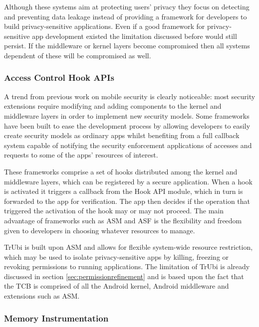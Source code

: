 Although these systems aim at protecting users' privacy they focus on detecting and preventing data leakage instead of providing a framework for developers to build privacy-sensitive applications. Even if a good framework for privacy-sensitive app development existed the limitation discussed before would still persist. If the middleware or kernel layers become compromised then all systems dependent of these will be compromised as well.

\subsubsection{Access Control Hook APIs}
\label{sec:accesscontrolhooks}

A trend from previous work on mobile security is clearly noticeable: most security extensions require modifying and adding components to the kernel and middleware layers in order to implement new security models. Some frameworks have been built to ease the development process by allowing developers to easily create security models as ordinary apps whilst benefiting from a full callback system capable of notifying the security enforcement applications of accesses and requests to some of the apps' resources of interest.

These frameworks comprise a set of hooks distributed among the kernel and middleware layers, which can be registered by a secure application. When a hook is activated it triggers a callback from the Hook API module, which in turn is forwarded to the app for verification. The app then decides if the operation that triggered the activation of the hook may or may not proceed. The main advantage of frameworks such as \ac{ASM} \cite{heuser2014asm} and \ac{ASF} \cite{backes2014android} is the flexibility and freedom given to developers in choosing whatever resources to manage.

TrUbi \cite{miguelcosta,nunoduarte} is built upon ASM and allows for flexible system-wide resource restriction, which may be used to isolate privacy-sensitive apps by killing, freezing or revoking permissions to running applications. The limitation of TrUbi is already discussed in section \ref{sec:permissionrefinement} and is based upon the fact that the \ac{TCB} is comprised of all the Android kernel, Android middleware and extensions such as \ac{ASM}.

\subsubsection{Memory Instrumentation}
\label{sec:meminstrumentation}

